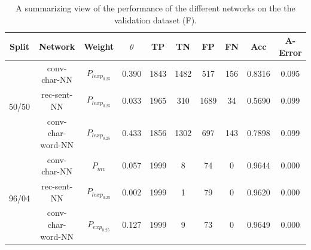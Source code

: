 \begin{table}[h]
\begin{tabular}{|c|c|c|c|c|c|c|c|c|c|}
\hline
Split                  & Network                 & Weight            & $\theta$ & TP  & TN  & FP  & FN & Acc     & A-Error \\ \hline
\multirow{3}{*}{50/50} & \gls{conv-char-NN}      & $P_{lexp_{0.25}}$ & 0.390    & 1843 & 1482 & 517  & 156 & 0.8316 & 0.095   \\ \cline{2-10} 
                       & \gls{rec-sent-NN}       & $P_{lexp_{0.25}}$ & 0.033    & 1965 & 310  & 1689 & 34  & 0.5690 & 0.099   \\ \cline{2-10} 
                       & \gls{conv-char-word-NN} & $P_{lexp_{0.25}}$ & 0.433    & 1856 & 1302 & 697  & 143 & 0.7898 & 0.099   \\ \hline
\multirow{3}{*}{96/04} & \gls{conv-char-NN}      & $P_{mv}$          & 0.057    & 1999 & 8    & 74   & 0   & 0.9644 & 0.000   \\ \cline{2-10} 
                       & \gls{rec-sent-NN}       & $P_{lexp_{0.25}}$ & 0.002    & 1999 & 1    & 79   & 0   & 0.9620 & 0.000   \\ \cline{2-10} 
                       & \gls{conv-char-word-NN} & $P_{exp_{0.25}}$  & 0.127    & 1999 & 9    & 73   & 0   & 0.9649 & 0.000   \\ \hline
\end{tabular}
\caption{A summarizing view of the performance of the different networks on the
the validation dataset (F).}
\label{tab:experi-results}
\end{table}
